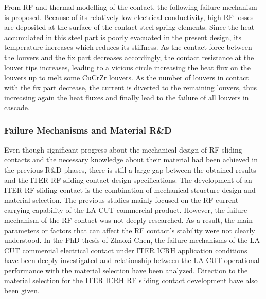 {From RF and thermal modelling of the contact, the following failure mechanism is proposed. Because of its relatively low electrical conductivity, high RF losses are deposited at the surface of the contact steel spring elements. Since the heat accumulated in this steel part is poorly evacuated in the present design, its temperature increases which reduces its stiffness. As the contact force between the louvers and the fix part decreases accordingly, the contact resistance at the louver tips increases, leading to a vicious circle increasing the heat flux on the louvers up to melt some CuCrZr louvers. As the number of louvers in contact with the fix part decrease, the current is diverted to the remaining louvers, thus increasing again the heat fluxes and finally lead to the failure of all louvers in cascade. 



\subsubsection{Failure Mechanisms and Material R\&D}
Even though significant progress about the mechanical design of RF sliding contacts and the necessary knowledge about their material had been achieved in the previous R\&D phases, there is still a large gap between the obtained results and the ITER RF sliding contact design specifications. The development of an ITER RF sliding contact is the combination of mechanical structure design and material selection. The previous studies mainly focused on the RF current carrying capability of the LA-CUT commercial product. However, the failure mechanism of the RF contact was not deeply researched. As a result, the main parameters or factors that can affect the RF contact's stability were not clearly understood. In the PhD thesis of Zhaoxi Chen, the failure mechanisms of the LA-CUT commercial electrical contact under ITER ICRH application conditions have been deeply investigated and relationship between the LA-CUT operational performance with the material selection have been analyzed. Direction to the material selection for the ITER ICRH RF sliding contact development have also been given. 

}
